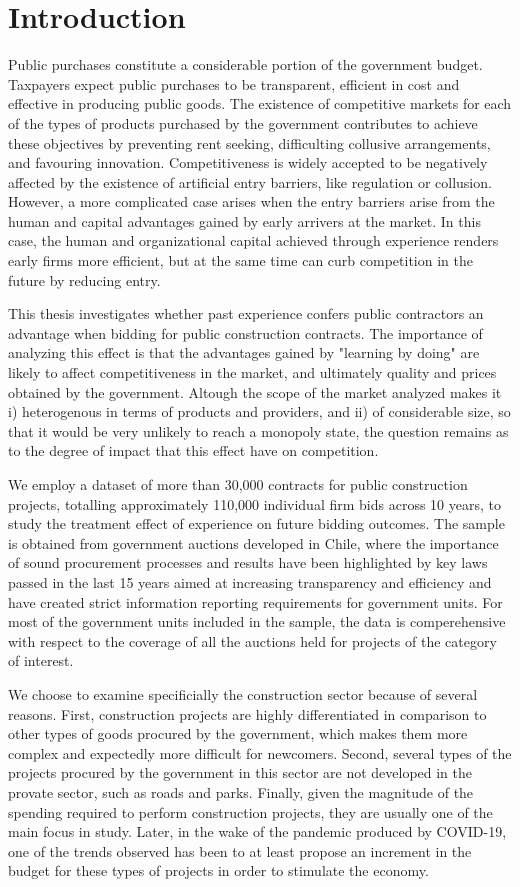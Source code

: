 \chapter{Introduction}
Public purchases constitute a considerable portion of the government budget. Taxpayers expect public purchases to be transparent, efficient in cost and effective in producing public goods. The existence of competitive markets for each of the types of products purchased by the government contributes to achieve these objectives by preventing rent seeking, difficulting collusive arrangements, and favouring innovation. Competitiveness is widely accepted to be negatively affected by the existence of artificial entry barriers, like regulation or collusion. However, a more complicated case arises when the entry barriers arise from the human and capital advantages gained by early arrivers at the market. In this case, the human and organizational capital achieved through experience renders early firms more efficient, but at the same time can curb competition in the future by reducing entry.

This thesis investigates whether past experience confers public contractors an advantage when bidding for public construction contracts. The importance of analyzing this effect is that the advantages gained by "learning by doing" are likely to affect competitiveness in the market, and ultimately quality and prices obtained by the government. Altough the scope of the market analyzed makes it i) heterogenous in terms of products and providers, and ii) of considerable size, so that it would be very unlikely to reach a monopoly state, the question remains as to the degree of impact that this effect have on competition.

We employ a dataset of more than 30,000 contracts for public construction projects, totalling approximately 110,000 individual firm bids across 10 years, to study the treatment effect of experience on future bidding outcomes. The sample is obtained from government auctions developed in Chile, where the importance of sound procurement processes and results have been highlighted by key laws passed in the last 15 years aimed at increasing transparency and efficiency and have created strict information reporting requirements for government units. For most of the government units included in the sample, the data is comperehensive with respect to the coverage of all the auctions held for projects of the category of interest.

We choose to examine specificially the construction sector because of several reasons. First, construction projects are highly differentiated in comparison to other types of goods procured by the government, which makes them more complex and expectedly more difficult for newcomers. Second, several types of the projects procured by the government in this sector are not developed in the provate sector, such as roads and parks. Finally, given the magnitude of the spending required to perform construction projects, they are usually one of the main focus in study. Later, in the wake of the pandemic produced by COVID-19, one of the trends observed has been to at least propose an increment in the budget for these types of projects in order to stimulate the economy.

